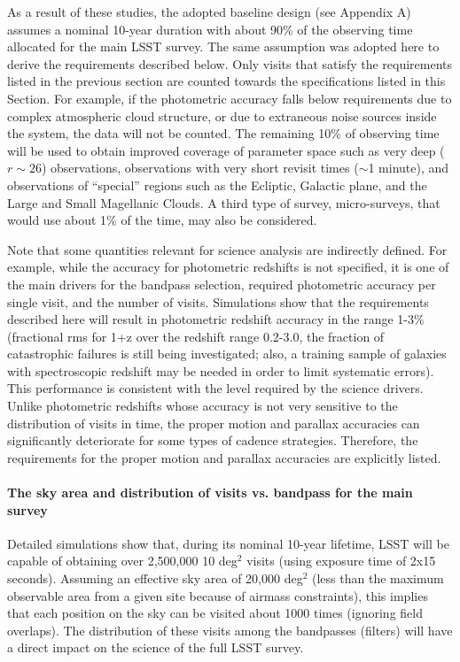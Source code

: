 As a result of these studies, the adopted baseline design (see Appendix A)
assumes a nominal 10-year duration with about 90\% of the observing
time allocated for the main LSST survey. The same assumption
was adopted here to derive the requirements described below.  Only visits
that satisfy the requirements listed in the previous section are counted
towards the specifications listed in this Section. For example, if the photometric
accuracy falls below requirements due to complex atmospheric cloud structure,
or due to extraneous noise sources inside the system, the data will not be counted.
The remaining 10\% of observing time will be used to obtain improved coverage
of parameter space such as very deep ($r\sim26$) observations, observations with
very short revisit times ($\sim$1 minute), and observations of  ``special'' regions
such as the Ecliptic, Galactic plane, and the Large and Small Magellanic Clouds.
A third type of survey, micro-surveys, that would use about 1\% of the time,
may also be considered.


Note that some quantities relevant for science analysis are indirectly
defined. For example, while the accuracy for photometric redshifts is not
specified, it is one of the main drivers for the bandpass selection, required photometric
accuracy per single visit, and the number of visits. Simulations show that
the requirements described here will result in photometric redshift
accuracy in the range 1-3\% (fractional rms for 1+z over the redshift range
0.2-3.0, the fraction of catastrophic failures is still being investigated;
also, a training sample of galaxies with spectroscopic redshift may be
needed in order to limit systematic errors). This performance is consistent
with the level required by the science drivers.
Unlike photometric redshifts whose accuracy is not very sensitive to
the distribution of visits in time,  the proper motion and parallax accuracies
can significantly deteriorate for some types of cadence strategies. Therefore,
the requirements for the proper motion and parallax accuracies  are explicitly
listed.



\paragraph{The sky area and distribution of visits vs. bandpass for the main survey\\}
\label{VvsB}

Detailed simulations show that, during its nominal 10-year  lifetime,
LSST will be capable of obtaining over 2,500,000 10 deg$^2$ visits
(using exposure time of 2x15 seconds).
Assuming an effective sky area of 20,000 deg$^2$ (less than the maximum
observable area from a given site because of airmass constraints), this
implies that each position on the sky can be visited about 1000 times
(ignoring field overlaps).  The distribution of these visits among the
bandpasses (filters) will have a direct impact on the science of the full
LSST survey.

